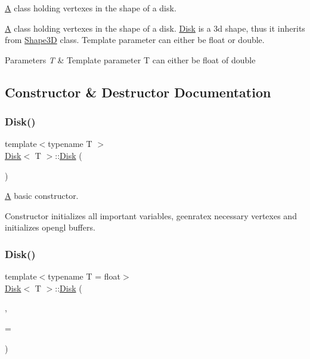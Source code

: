 \mbox{\hyperlink{classA}{A}} class holding vertexes in the shape of a disk. 

\mbox{\hyperlink{classA}{A}} class holding vertexes in the shape of a disk. \mbox{\hyperlink{classDisk}{Disk}} is a 3d shape, thus it inherits from \mbox{\hyperlink{classShape3D}{Shape3D}} class. Template parameter can either be float or double. 
\begin{DoxyParams}{Parameters}
{\em T} & Template parameter T can either be float of double \\
\hline
\end{DoxyParams}


\subsection{Constructor \& Destructor Documentation}
\mbox{\label{classDisk_a88bcdb9bf91c8e9c18cdf551e558ab8c}} 
\subsubsection{\texorpdfstring{Disk()}{Disk()}\hspace{0.1cm}{\footnotesize\ttfamily [1/4]}}
{\footnotesize\ttfamily template$<$typename T $>$ \\
\mbox{\hyperlink{classDisk}{Disk}}$<$ T $>$\+::\mbox{\hyperlink{classDisk}{Disk}} (\begin{DoxyParamCaption}{ }\end{DoxyParamCaption})}



\mbox{\hyperlink{classA}{A}} basic constructor. 

Constructor initializes all important variables, geenratex necessary vertexes and initializes opengl buffers. \mbox{\label{classDisk_af73e1930d8da87b05c813814532dd43a}} 
\subsubsection{\texorpdfstring{Disk()}{Disk()}\hspace{0.1cm}{\footnotesize\ttfamily [2/4]}}
{\footnotesize\ttfamily template$<$typename T  = float$>$ \\
\mbox{\hyperlink{classDisk}{Disk}}$<$ T $>$\+::\mbox{\hyperlink{classDisk}{Disk}} (\begin{DoxyParamCaption}\item[{int}]{,  }\item[{T}]{ = {} }\end{DoxyParamCaption})}

